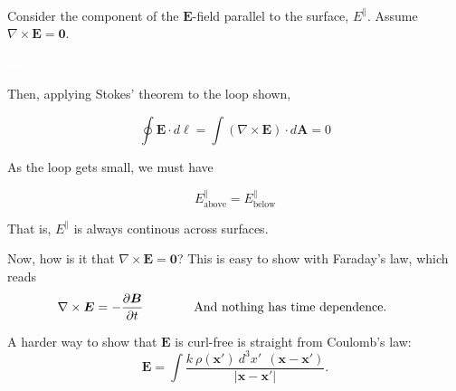 \documentclass{article}
\numberwithin{equation}{section}
\newcommand{\bunny}[1][]{
    \tikz \fill [scale=1ex/500,yscale=1,#1] svg "M3831 8683 c-70 -71 -235 -358 -326 -567 -168 -385 -252 -748 -275 -1181 -5 -104 -9 -199 -7 -209 2 -16 -10 -21 -88 -36 -158 -31 -407 -112 -530 -173 -117 -58 -239 -150 -365 -277 -178 -177 -305 -366 -407 -604 -44 -102 -55 -118 -136 -201 -110 -113 -148 -183 -154 -288 -4 -53 0 -88 14 -132 12 -37 16 -70 12 -85 -4 -14 -7 -62 -8 -107 -3 -225 125 -386 369 -461 66 -20 157 -35 282 -47 l68 -7 -25 -47 c-41 -81 -59 -197 -52 -341 10 -200 66 -413 174 -660 153 -347 352 -632 640 -914 l104 -102 9 -95 c13 -131 12 -378 -1 -441 -25 -115 -92 -205 -180 -242 -138 -58 -168 -77 -220 -139 -92 -109 -110 -180 -63 -237 63 -75 165 -100 429 -107 159 -4 215 -2 275 11 267 57 455 273 539 619 20 84 29 107 41 103 8 -3 89 -37 179 -76 197 -86 466 -177 651 -220 74 -18 142 -34 150 -37 8 -3 -14 -15 -50 -28 -257 -88 -340 -205 -227 -319 48 -47 82 -58 257 -78 225 -26 1652 -9 1850 23 75 12 154 51 184 92 22 30 23 43 15 268 -3 65 0 83 25 133 50 102 131 161 255 187 46 9 67 8 150 -11 230 -54 428 -7 556 131 71 77 99 149 92 240 -7 115 -65 203 -185 282 -218 145 -282 308 -264 665 30 563 -100 1035 -383 1397 -78 99 -236 254 -335 327 -319 238 -731 392 -1245 468 -301 44 -438 49 -1090 37 -69 -2 -107 3 -160 20 l-70 22 3 238 c3 183 0 265 -12 356 -18 123 -53 275 -81 340 -16 38 -16 40 9 70 456 567 686 1088 725 1647 21 289 -41 691 -116 749 -28 23 -72 27 -106 10 -63 -31 -322 -342 -452 -541 -38 -59 -73 -108 -77 -108 -5 0 -8 11 -8 24 0 14 -9 74 -21 133 -44 228 -158 517 -217 547 -50 26 -80 20 -121 -21z";
}
\begin{document}
\begin{minipage}{0.4\textwidth}
\begin{flushleft}
\begin{figure}[H]
\label{fig:2:i}
\end{figure}
\end{flushleft}
\end{minipage}
~
\begin{minipage}{0.6\textwidth}
\begin{flushright}
\parbox[c]{\textwidth}{\begin{flushleft} Consider the component of the $\bm{E}$-field parallel to the surface, $E^{\parallel}$. Assume $\nabla \times \bm{E} = \bm{0}$. \end{flushleft}}
\textcolor{white}{here}
\parbox[c]{\textwidth}{Then, applying Stokes' theorem to the loop shown, }
\parbox[c]{\textwidth}{\begin{equation*} \oint \bm{E} \cdot d\bm{\ell} = \int \left( \nabla \times \bm{E} \right) \cdot d\bm{A} = 0 \end{equation*}}
\parbox[c]{\textwidth}{As the loop gets small, we must have}
\parbox[c]{\textwidth}{\begin{equation*} \boxed{E_{\text{above}}^{\parallel} = E_{\text{below}}^{\parallel}} \end{equation*}}
\parbox[c]{\textwidth}{\begin{flushleft} That is, $E^{\parallel}$ is always continous across surfaces. \end{flushleft}}
\end{flushright}
\end{minipage}

Now, how is it that $\displaystyle \nabla \times \bm{E} = \bm{0}$? This is easy to show with Faraday's law, which reads
\begin{equation*}
    \nabla \times \bm{E} = -\frac{\partial \bm{B}}{\partial t} \qquad\qquad \parbox[c]{0.5\textwidth}{And nothing has time dependence.}
\end{equation*}

A harder way to show that $\bm{E}$ is curl-free is straight from Coulomb's law:
\begin{equation*}
    \bm{E} = \int \frac{k\ \rho(\bm{x'})\ d^3x'\ \ \left( \bm{x} - \bm{x'} \right)}{\left| \bm{x} - \bm{x'} \right|}.
\end{equation*}
\end{document}
